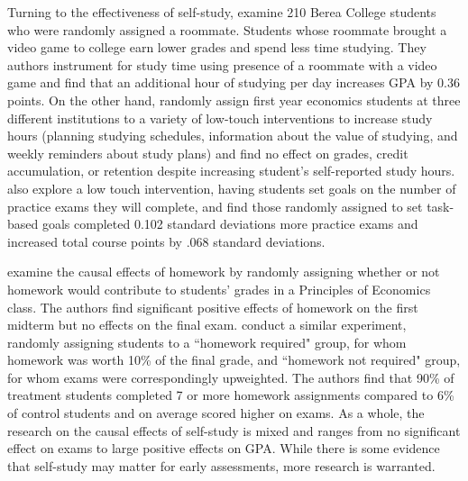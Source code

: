 \documentclass[12pt]{article}
\begin{document}
Turning to the effectiveness of self-study, \textcite{ss2008} examine 210 Berea College students who were randomly assigned a roommate. Students whose roommate brought a video game to college earn lower grades and spend less time studying. They authors instrument for study time using presence of a roommate with a video game and find that an additional hour of studying per day increases GPA by 0.36 points. On the other hand, \textcite{oppp2019} randomly assign first year economics students at three different institutions to a variety of low-touch interventions to increase study hours (planning studying schedules, information about the value of studying, and weekly reminders about study plans) and find no effect on grades, credit accumulation, or retention despite increasing student's self-reported study hours. \textcite{cgpr2020} also explore a low touch intervention, having students set goals on the number of practice exams they will complete, and find those randomly assigned to set task-based goals completed 0.102 standard deviations more practice exams and increased total course points by .068 standard deviations.

\textcite{ts2012} examine the causal effects of homework by randomly assigning whether or not homework would contribute to students' grades in a Principles of Economics class. The authors find significant positive effects of homework on the first midterm but no effects on the final exam. \textcite{gr2013} conduct a similar experiment, randomly assigning students to a ``homework required" group, for whom homework was worth 10\% of the final grade, and ``homework not required" group, for whom exams were correspondingly upweighted. The authors find that 90\% of treatment students completed 7 or more homework assignments compared to 6\% of control students and on average scored higher on exams. As a whole, the research on the causal effects of self-study is mixed and ranges from no significant effect on exams to large positive effects on GPA. While there is some evidence that self-study may matter for early assessments, more research is warranted.
\end{document}

